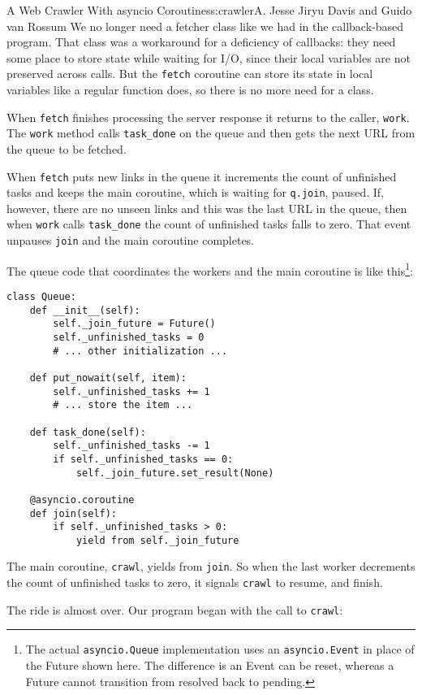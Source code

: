 \begin{aosachapter}{A Web Crawler With asyncio Coroutines}{s:crawler}{A. Jesse Jiryu Davis and Guido van Rossum}
We no longer need a fetcher class like we had in the callback-based
program. That class was a workaround for a deficiency of callbacks: they
need some place to store state while waiting for I/O, since their local
variables are not preserved across calls. But the \texttt{fetch}
coroutine can store its state in local variables like a regular function
does, so there is no more need for a class.

When \texttt{fetch} finishes processing the server response it returns
to the caller, \texttt{work}. The \texttt{work} method calls
\texttt{task\_done} on the queue and then gets the next URL from the
queue to be fetched.

When \texttt{fetch} puts new links in the queue it increments the count
of unfinished tasks and keeps the main coroutine, which is waiting for
\texttt{q.join}, paused. If, however, there are no unseen links and this
was the last URL in the queue, then when \texttt{work} calls
\texttt{task\_done} the count of unfinished tasks falls to zero. That
event unpauses \texttt{join} and the main coroutine completes.

The queue code that coordinates the workers and the main coroutine is
like this\footnote{The actual \texttt{asyncio.Queue} implementation uses
  an \texttt{asyncio.Event} in place of the Future shown here. The
  difference is an Event can be reset, whereas a Future cannot
  transition from resolved back to pending.}:

\begin{verbatim}
class Queue:
    def __init__(self):
        self._join_future = Future()
        self._unfinished_tasks = 0
        # ... other initialization ...
    
    def put_nowait(self, item):
        self._unfinished_tasks += 1
        # ... store the item ...

    def task_done(self):
        self._unfinished_tasks -= 1
        if self._unfinished_tasks == 0:
            self._join_future.set_result(None)

    @asyncio.coroutine
    def join(self):
        if self._unfinished_tasks > 0:
            yield from self._join_future
\end{verbatim}

The main coroutine, \texttt{crawl}, yields from \texttt{join}. So when
the last worker decrements the count of unfinished tasks to zero, it
signals \texttt{crawl} to resume, and finish.

The ride is almost over. Our program began with the call to
\texttt{crawl}:


\end{aosachapter}
